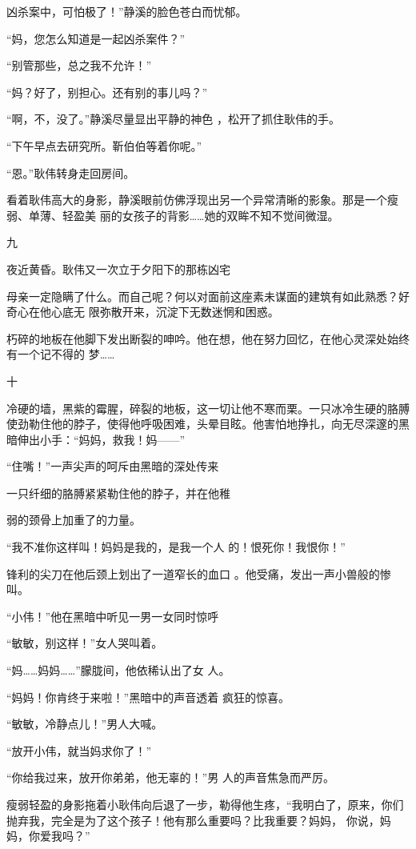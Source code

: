 \documentclass{article}
\begin{document}
凶杀案中，可怕极了！”静溪的脸色苍白而忧郁。 


“妈，您怎么知道是一起凶杀案件？” 


“别管那些，总之我不允许！” 


“妈？好了，别担心。还有别的事儿吗？” 

“啊，不，没了。”静溪尽量显出平静的神色
，松开了抓住耿伟的手。 


“下午早点去研究所。靳伯伯等着你呢。” 


“恩。”耿伟转身走回房间。 

看着耿伟高大的身影，静溪眼前仿佛浮现出另一个异常清晰的影象。那是一个瘦弱、单薄、轻盈美
丽的女孩子的背影……她的双眸不知不觉间微湿。 


九 

\newpage

夜近黄昏。耿伟又一次立于夕阳下的那栋凶宅

母亲一定隐瞒了什么。而自己呢？何以对面前这座素未谋面的建筑有如此熟悉？好奇心在他心底无
限弥散开来，沉淀下无数迷惘和困惑。 

朽碎的地板在他脚下发出断裂的呻吟。他在想，他在努力回忆，在他心灵深处始终有一个记不得的
梦…… 


十 

冷硬的墙，黑紫的霉腥，碎裂的地板，这一切让他不寒而栗。一只冰冷生硬的胳膊使劲勒住他的脖子，使得他呼吸困难，头晕目眩。他害怕地挣扎，向无尽深邃的黑暗伸出小手：“妈妈，救我！妈——”

“住嘴！”一声尖声的呵斥由黑暗的深处传来

一只纤细的胳膊紧紧勒住他的脖子，并在他稚

\newpage
弱的颈骨上加重了的力量。 

“我不准你这样叫！妈妈是我的，是我一个人
的！恨死你！我恨你！” 

锋利的尖刀在他后颈上划出了一道窄长的血口
。他受痛，发出一声小兽般的惨叫。 

“小伟！”他在黑暗中听见一男一女同时惊呼


“敏敏，别这样！”女人哭叫着。 

“妈……妈妈……”朦胧间，他依稀认出了女
人。 

“妈妈！你肯终于来啦！”黑暗中的声音透着
疯狂的惊喜。 


“敏敏，冷静点儿！”男人大喊。 


“放开小伟，就当妈求你了！” 

\newpage

“你给我过来，放开你弟弟，他无辜的！”男
人的声音焦急而严厉。 

瘦弱轻盈的身影拖着小耿伟向后退了一步，勒得他生疼，“我明白了，原来，你们抛弃我，完全是为了这个孩子！他有那么重要吗？比我重要？妈妈，
你说，妈妈，你爱我吗？” 
\end{document}
